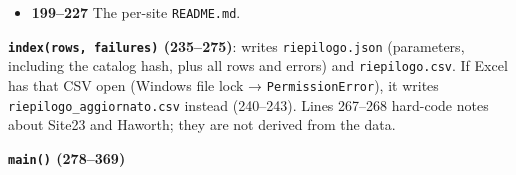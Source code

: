 \documentclass[11pt,a4paper]{article}
\providecommand{\tightlist}{\setlength{\itemsep}{0pt}\setlength{\parskip}{0pt}}
\begin{document}
\begin{itemize}
  \begin{itemize}
  \tightlist
  \item
    \texttt{azimut\_ostruzione\_aumentata}: how many
    directions far terrain raised by \textgreater{} 1e-4°;
  \item
    \texttt{aumento\_massimo\_orizzonte\_deg}: the
    largest such increase;
  \item
    \texttt{distanza\_sito\_centro\_dem\_m}.
  \end{itemize}
\item
  \textbf{199--227} The per-site \texttt{README.md}.
\end{itemize}

\textbf{\texttt{index(rows, failures)} (235--275)}:
writes \texttt{riepilogo.json} (parameters, including
the catalog hash, plus all rows and errors) and
\texttt{riepilogo.csv}. If Excel has that CSV open
(Windows file lock → \texttt{PermissionError}), it
writes \texttt{riepilogo\_aggiornato.csv} instead
(240--243). Lines 267--268 hard-code notes about Site23 and Haworth;
they are not derived from the data.

\textbf{\texttt{main()} (278--369)}
\end{document}
